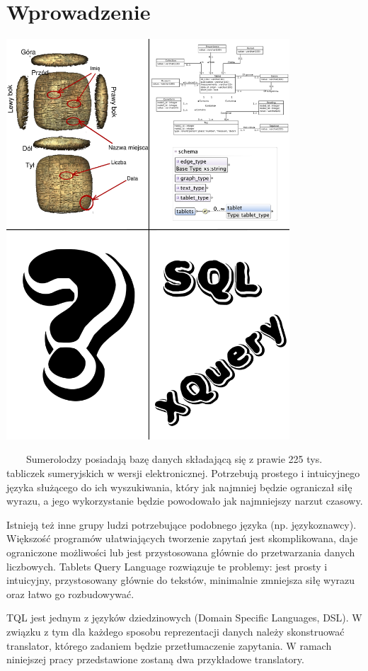 \chapter*{Wprowadzenie}
\includegraphics[width=400px]{./diagramy/poco.pdf}

\ \ \ \ Sumerolodzy posiadają bazę danych składającą się z prawie 225 tys. tabliczek sumeryjskich w wersji elektronicznej. 
Potrzebują prostego i intuicyjnego języka służącego do ich wyszukiwania, który jak najmniej będzie ograniczał siłę wyrazu,
 a jego wykorzystanie będzie powodowało jak najmniejszy narzut czasowy.

Istnieją też inne grupy ludzi potrzebujące podobnego języka (np. językoznawcy). 
Większość programów ułatwiających tworzenie zapytań jest skomplikowana, daje ograniczone możliwości lub jest przystosowana głównie do przetwarzania danych liczbowych. Tablets Query Language rozwiązuje te problemy: jest prosty i intuicyjny, przystosowany głównie do tekstów, minimalnie zmniejsza siłę wyrazu oraz łatwo go rozbudowywać. 

TQL jest jednym z języków dziedzinowych (Domain Specific Languages, DSL). 
W związku z tym dla każdego sposobu reprezentacji danych należy skonstruować translator, 
którego zadaniem będzie przetłumaczenie zapytania. 
W ramach niniejszej pracy przedstawione zostaną dwa przykładowe translatory.
